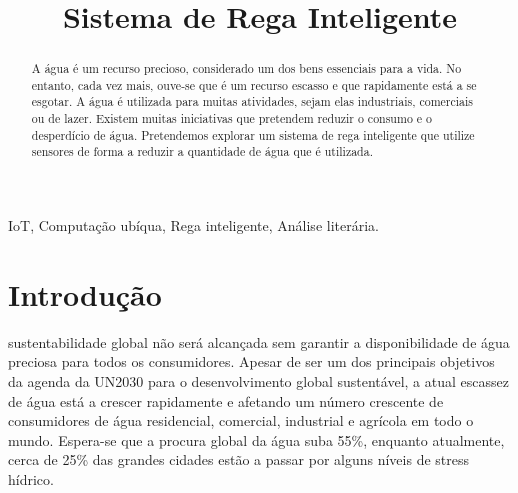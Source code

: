\documentclass[conference]{IEEEtran}
\begin{document}
\title{Sistema de Rega Inteligente}

\author{
\and
{}
}

\maketitle

\begin{abstract}
A água é um recurso precioso, considerado um dos bens essenciais para a vida. 
No entanto, cada vez mais, ouve-se que é um recurso escasso e que rapidamente está a se esgotar. 
A água é utilizada para muitas atividades, sejam elas industriais, comerciais ou de lazer. 
Existem muitas iniciativas que pretendem reduzir o consumo e o desperdício de água. 
Pretendemos explorar um sistema de rega inteligente que utilize sensores de forma a 
reduzir a quantidade de água que é utilizada.
\end{abstract}

\begin{IEEEkeywords}
IoT, Computação ubíqua, Rega inteligente, Análise literária.
\end{IEEEkeywords}

\section{Introdução}
 sustentabilidade global não será alcançada sem garantir a 
disponibilidade de água preciosa para todos os consumidores. Apesar de ser um 
dos principais objetivos da agenda da UN2030 para o desenvolvimento global sustentável, 
a atual escassez de água está a crescer rapidamente e afetando um número crescente de consumidores 
de água residencial, comercial, industrial e agrícola em todo o mundo. Espera-se que a procura 
global da água suba 55\%, enquanto atualmente, cerca de 25\% das grandes cidades estão a passar 
por alguns níveis de stress hídrico. 
\end{document}
